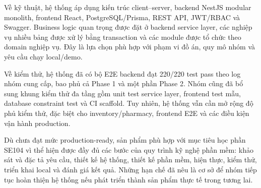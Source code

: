 Về kỹ thuật, hệ thống áp dụng kiến trúc client--server, backend NestJS modular monolith, frontend React, PostgreSQL/Prisma, REST API, JWT/RBAC và Swagger. Business logic quan trọng được đặt ở backend service layer, các nghiệp vụ nhiều bảng được xử lý bằng transaction và các module được tổ chức theo domain nghiệp vụ. Đây là lựa chọn phù hợp với phạm vi đồ án, quy mô nhóm và yêu cầu chạy local/demo.

Về kiểm thử, hệ thống đã có bộ E2E backend đạt 220/220 test pass theo log nhóm cung cấp, bao phủ cả Phase 1 và một phần Phase 2. Nhóm cũng đã bổ sung khung kiểm thử đa tầng gồm unit test service layer, frontend test mẫu, database constraint test và CI scaffold. Tuy nhiên, hệ thống vẫn cần mở rộng độ phủ kiểm thử, đặc biệt cho inventory/pharmacy, frontend E2E và các điều kiện vận hành production.

Dù chưa đạt mức production-ready, sản phẩm phù hợp với mục tiêu học phần SE104 vì thể hiện được đầy đủ các bước của quy trình kỹ nghệ phần mềm: khảo sát và đặc tả yêu cầu, thiết kế hệ thống, thiết kế phần mềm, hiện thực, kiểm thử, triển khai local và đánh giá kết quả. Những hạn chế đã nêu là cơ sở để nhóm tiếp tục hoàn thiện hệ thống nếu phát triển thành sản phẩm thực tế trong tương lai.

